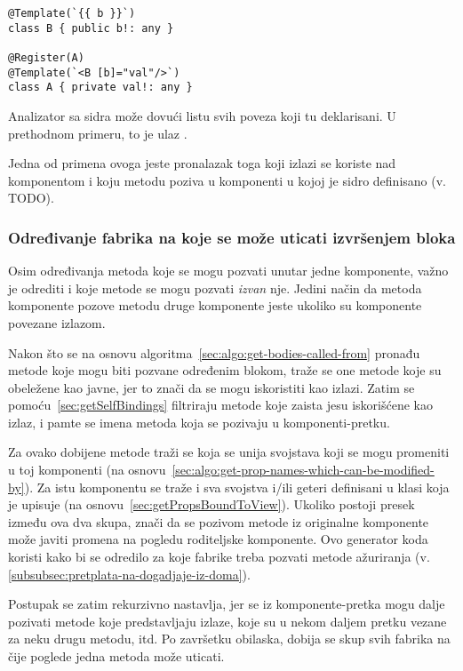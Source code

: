 \begin{lstlisting}
@Template(`{{ b }}`)
class B { public b!: any }

@Register(A)
@Template(`<B [b]="val"/>`)
class A { private val!: any }
\end{lstlisting}

Analizator sa sidra može dovući listu svih poveza koji tu deklarisani.
U prethodnom primeru, to je ulaz .

Jedna od primena ovoga jeste pronalazak toga koji izlazi se koriste nad komponentom i koju metodu poziva u komponenti u kojoj je sidro definisano (v. TODO).

\subsubsection{Određivanje fabrika na koje se može uticati izvršenjem bloka} %
\label{fn:getFactoriesAffectedByCalling}

Osim određivanja metoda koje se mogu pozvati unutar jedne komponente, važno je odrediti i koje metode se mogu pozvati \emph{izvan} nje.
Jedini način da metoda komponente pozove metodu druge komponente jeste ukoliko su komponente povezane izlazom.

Nakon što se na osnovu algoritma~\cref{sec:algo:get-bodies-called-from} pronađu metode koje mogu biti pozvane određenim blokom, traže se one metode koje su obeležene kao javne, jer to znači da se mogu iskoristiti kao izlazi.
Zatim se pomoću~\cref{sec:getSelfBindings} filtriraju metode koje zaista jesu iskorišćene kao izlaz, i pamte se imena metoda koja se pozivaju u komponenti-pretku.

Za ovako dobijene metode traži se koja se unija svojstava koji se mogu promeniti u toj komponenti (na osnovu~\cref{sec:algo:get-prop-names-which-can-be-modified-by}).
Za istu komponentu se traže i sva svojstva i/ili geteri definisani u klasi koja je upisuje (na osnovu~\cref{sec:getPropsBoundToView}).
Ukoliko postoji presek između ova dva skupa, znači da se pozivom metode iz originalne komponente može javiti promena na pogledu roditeljske komponente.
Ovo generator koda koristi kako bi se odredilo za koje fabrike treba pozvati metode ažuriranja (v. \cref{subsubsec:pretplata-na-dogadjaje-iz-doma}).

Postupak se zatim rekurzivno nastavlja, jer se iz komponente-pretka mogu dalje pozivati metode koje predstavljaju izlaze, koje su u nekom daljem pretku vezane za neku drugu metodu, itd.
Po završetku obilaska, dobija se skup svih fabrika na čije poglede jedna metoda može uticati.

